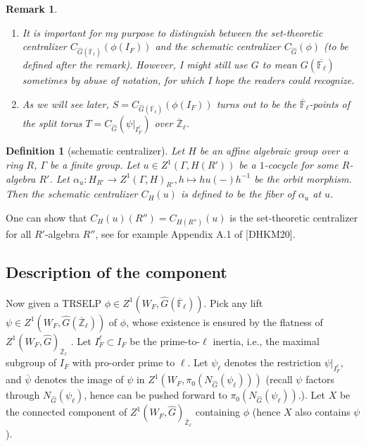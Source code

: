 \documentclass{article}
\newcommand{\red}[1]{\textcolor{red}{#1}}
\newtheorem*{remark}{Remark}
\newtheorem{definition}{Definition}
\begin{document}
	\begin{remark}
		\begin{enumerate}
			\item It is important for my purpose to distinguish between the set-theoretic centralizer $C_{\hat{G}(\overline{\mathbb{F}}_{\ell})}(\phi(I_F))$ and the schematic centralizer $C_{\hat{G}}(\phi)$ (to be defined after the remark). However, I might still use $G$ to mean $G(\overline{\mathbb{F}_{\ell}})$ sometimes by abuse of notation, for which I hope the readers could recognize.
			\item As we will see later, $S=C_{\hat{G}(\overline{\mathbb{F}}_{\ell})}(\phi(I_F))$ turns out to be the $\overline{\mathbb{F}}_{\ell}$-points of the split torus $T=C_{\hat{G}}(\psi|_{I_F^\ell})$ over $\overline{\mathbb{Z}}_{\ell}$.
		\end{enumerate} 
	\end{remark}
	
	\begin{definition}[schematic centralizer]
		Let $H$ be an affine algebraic group over a ring $R$, $\Gamma$ be a finite group. Let $u \in Z^1(\Gamma, H(R'))$ be a $1$-cocycle for some $R$-algebra $R'$. Let $\alpha_u: H_{R'} \to Z^1(\Gamma, H)_{R'}, h \mapsto hu(-)h^{-1}$ be the orbit morphism. Then the schematic centralizer $C_H(u)$ is defined to be the fiber of $\alpha_u$ at $u$.
		
		
	\end{definition}
	
	One can show that $C_H(u)(R'')=C_{H(R'')}(u)$ is the set-theoretic centralizer for all $R'$-algebra $R''$, see for example Appendix A.1 of [DHKM20].
	
	
	
	
	
	\subsection{Description of the component}
	
	Now given a TRSELP $\phi \in Z^1(W_F, \hat{G}(\overline{\mathbb{F}}_{\ell}))$. Pick any lift $\psi \in Z^1(W_F, \hat{G}(\overline{\mathbb{Z}}_{\ell}))$ of $\phi$, whose existence is ensured by the flatness of $Z^1(W_F, \hat{G})_{\overline{\mathbb{Z}}_{\ell}}$ %
	. Let $I_F^{\ell} \subset I_F$ be the prime-to-$\ell$ inertia, i.e., the maximal subgroup of $I_F$ with pro-order prime to $\ell$. Let $\psi_{\ell}$ denotes the restriction $\psi|_{I_F^{\ell}}$, and $\overline{\psi}$ denotes the image of $\psi$ in $Z^1(W_F, \pi_0(N_{\hat{G}}(\psi_{\ell})))$ (recall $\psi$ factors through $N_{\hat{G}}(\psi_{\ell})$, hence can be pushed forward to $\pi_0(N_{\hat{G}}(\psi_{\ell}))$.). Let $X$ be the connected component of $Z^1(W_F, \hat{G})_{\overline{\mathbb{Z}}_{\ell}}$ containing $\phi$ (hence $X$ also contains $\psi$). 
	
\end{document}
